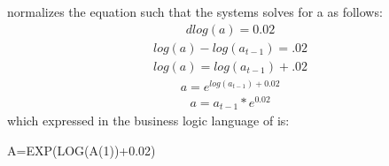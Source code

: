 \documentclass[letterpaper,10pt,english]{jupyterBook}
\begin{document}
\sphinxAtStartPar
{} normalizes the equation such that the systems solves for a as follows:
\begin{equation*}
\begin{split}dlog(a)  = 0.02\end{split}
\end{equation*}\begin{equation*}
\begin{split}log(a)-log(a_{t-1}) = .02\end{split}
\end{equation*}\begin{equation*}
\begin{split}log(a)=log(a_{t-1})+.02\end{split}
\end{equation*}\begin{equation*}
\begin{split}a = e^{log(a_{t-1})+0.02}\end{split}
\end{equation*}\begin{equation*}
\begin{split}a =a_{t-1}*e^{0.02}\end{split}
\end{equation*}
\sphinxAtStartPar
which expressed in the business logic language of  is:

\sphinxAtStartPar
A=EXP(LOG(A(\sphinxhyphen{}1))+0.02)
\end{document}
